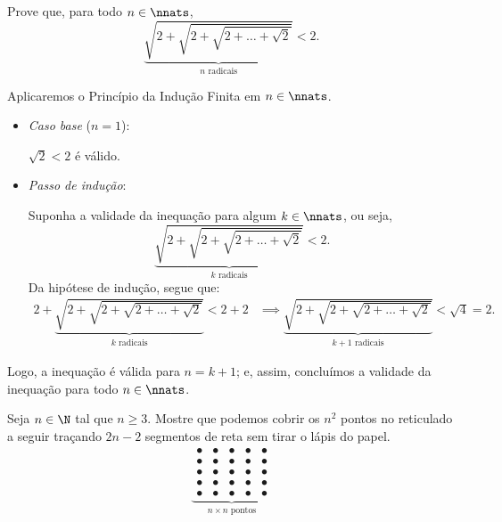 \begin{example}
Prove  que, para todo $n \in \nnats$,
%
\begin{equation*}
\underbrace{\sqrt{2+\sqrt{2+\sqrt{2+ \dots + \sqrt 2}}}}_{n  \text{ radicais}} < 2.
\end{equation*}
\end{example}

\begin{solution}
Aplicaremos o Princípio da Indução Finita em $n \in \nnats$.
%
\begin{itemize}
	\item \textit{Caso base} ($n=1$):

	$\sqrt 2 < 2$ é válido.

	\item \textit{Passo de indução}:

	Suponha a validade da inequação para algum $k \in \nnats$, ou seja, 
	\begin{equation*}
	\underbrace{\sqrt{2+\sqrt{2+\sqrt{2+ \dots + \sqrt 2}}}}_{k  \text{ radicais}} < 2.
	\end{equation*}
	Da hipótese de indução, segue que:
	\begin{align*}
	2+\underbrace{\sqrt{2+\sqrt{2+\sqrt{2+ \dots + \sqrt 2}}}}_{k  \text{ radicais}} < 2+2 & \implies \underbrace{\sqrt{2+\sqrt{2+\sqrt{2+ \dots + \sqrt 2}}}}_{k+1  \text{ radicais}} < \sqrt 4 = 2.
	\end{align*}
\end{itemize}
%
Logo, a inequação é válida para $n = k+1$; e, assim, concluímos a validade da inequação para todo $n \in \nnats$.
\end{solution}

\begin{example}
Seja $n \in \N$ tal que $n\ge 3$. Mostre  que podemos cobrir os $n^2$ pontos no reticulado a seguir traçando $2n-2$ segmentos de reta sem tirar o lápis do papel.
%
\begin{equation*}
\underbrace{\begin{array}{ccccc}
                \bullet & \bullet & \bullet & \bullet & \bullet \\
                \bullet & \bullet & \bullet & \bullet & \bullet \\
                \bullet & \bullet & \bullet & \bullet & \bullet \\
                \bullet & \bullet & \bullet & \bullet & \bullet \\
                \bullet & \bullet & \bullet & \bullet & \bullet
              \end{array}
}_{n \times n \text{ pontos}}
\end{equation*}
\end{example}

